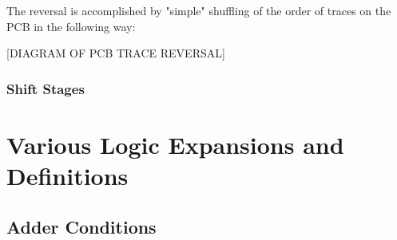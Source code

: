 \documentclass[a4paper, 11pt]{article}
\begin{document}
                The reversal is accomplished by "simple" shuffling of the order of traces
                on the PCB in the following way:

                [DIAGRAM OF PCB TRACE REVERSAL]

            \subsubsection{Shift Stages}\label{sec:ALU:Shifter:ShiftStages}

    \pagebreak
    \printbibliography[heading=bibintoc, title={References}]

    \pagebreak
    \appendix
    \section{Various Logic Expansions and Definitions}
    \label{app:LogDefs}

        \subsection{Adder Conditions}
        \label{app:LogDefs:AddConds}
      
\end{document}
